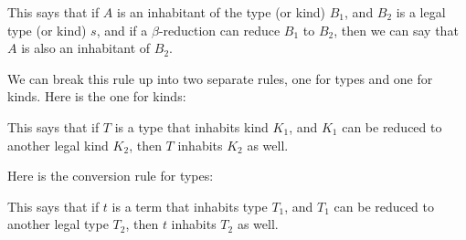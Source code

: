 \documentclass{book}
\numberwithin{equation}{chapter}
\begin{document}
\begin{prooftree}
\end{prooftree}

\noindent
This says that if $A$ is an inhabitant of the type (or kind) $B_{1}$, and $B_{2}$ is a legal type (or kind) $s$, and if a $\beta$-reduction can reduce $B_{1}$ to $B_{2}$, then we can say that $A$ is also an inhabitant of $B_{2}$.

We can break this rule up into two separate rules, one for types and one for kinds. Here is the one for kinds:

\begin{prooftree}
\end{prooftree}

\noindent
This says that if $T$ is a type that inhabits kind $K_{1}$, and $K_{1}$ can be reduced to another legal kind $K_{2}$, then $T$ inhabits $K_{2}$ as well.

Here is the conversion rule for types:

\begin{prooftree}
\end{prooftree}

\noindent
This says that if $t$ is a term that inhabits type $T_{1}$, and $T_{1}$ can be reduced to another legal type $T_{2}$, then $t$ inhabits $T_{2}$ as well.
\end{document}
